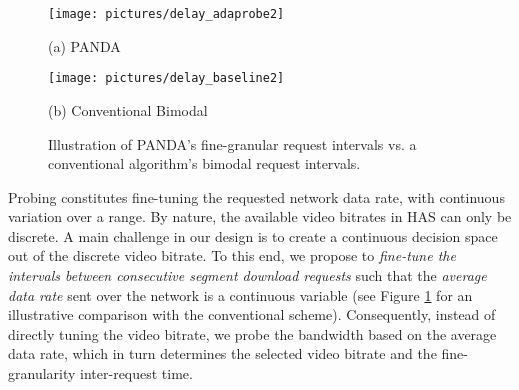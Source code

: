 \documentclass[conference]{IEEEtran}
\theoremstyle{plain}
\theoremstyle{definition}
\theoremstyle{plain}
\theoremstyle{plain}
\begin{document}
\begin{figure}
\begin{centering}
\begin{minipage}[t]{1\columnwidth}\begin{center}
\texttt{[image: pictures/delay\_adaprobe2]} 
\par\end{center}

\begin{center}
\vspace{-0.2in}
(a) PANDA\vspace{-0.01in}

\par\end{center}\end{minipage}
\par\end{centering}

\begin{centering}
\vspace{0.05in}
\begin{minipage}[t]{1\columnwidth}\begin{center}
\texttt{[image: pictures/delay\_baseline2]} 
\par\end{center}

\begin{center}
\vspace{-0.05in}
(b) Conventional Bimodal 
\par\end{center}\end{minipage}
\par\end{centering}

\vspace{0.05in}
\caption{Illustration of PANDA's fine-granular request intervals vs. a conventional
algorithm's bimodal request intervals.}


\label{Flo:delay} \vspace{-0.05in}
\end{figure}


Probing constitutes fine-tuning the requested network data rate, with
continuous variation over a range. By nature, the available video
bitrates in HAS can only be discrete. A main challenge in our design
is to create a continuous decision space out of the discrete video
bitrate. To this end, we propose to \emph{fine-tune the intervals
between consecutive segment download requests} such that the \emph{average
data rate} sent over the network is a continuous variable (see Figure
\ref{Flo:delay} for an illustrative comparison with the conventional
scheme). Consequently, instead of directly tuning the video bitrate,
we probe the bandwidth based on the average data rate, which in turn
determines the selected video bitrate and the fine-granularity inter-request
time. 
\end{document}
